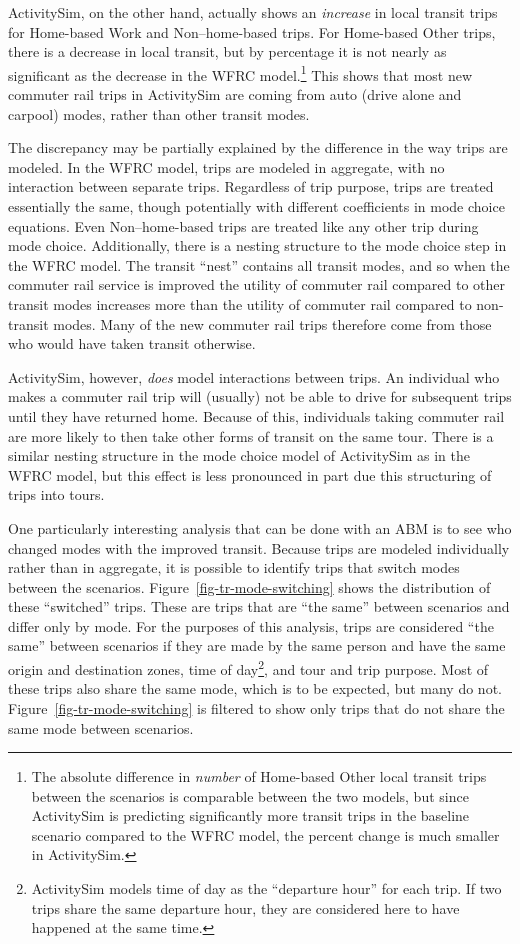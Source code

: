 \documentclass[fancy, twoside, mastersfancy, ms]{byuthesis}
\begin{document}
ActivitySim, on the other hand, actually shows an \emph{increase} in
local transit trips for Home-based Work and Non--home-based trips. For
Home-based Other trips, there is a decrease in local transit, but by
percentage it is not nearly as significant as the decrease in the WFRC
model.\footnote{The absolute difference in \emph{number} of Home-based
  Other local transit trips between the scenarios is comparable between
  the two models, but since ActivitySim is predicting significantly more
  transit trips in the baseline scenario compared to the WFRC model, the
  percent change is much smaller in ActivitySim.} This shows that most
new commuter rail trips in ActivitySim are coming from auto (drive alone
and carpool) modes, rather than other transit modes.

The discrepancy may be partially explained by the difference in the way
trips are modeled. In the WFRC model, trips are modeled in aggregate,
with no interaction between separate trips. Regardless of trip purpose,
trips are treated essentially the same, though potentially with
different coefficients in mode choice equations. Even Non--home-based
trips are treated like any other trip during mode choice. Additionally,
there is a nesting structure to the mode choice step in the WFRC model.
The transit ``nest'' contains all transit modes, and so when the
commuter rail service is improved the utility of commuter rail compared
to other transit modes increases more than the utility of commuter rail
compared to non-transit modes. Many of the new commuter rail trips
therefore come from those who would have taken transit otherwise.

ActivitySim, however, \emph{does} model interactions between trips. An
individual who makes a commuter rail trip will (usually) not be able to
drive for subsequent trips until they have returned home. Because of
this, individuals taking commuter rail are more likely to then take
other forms of transit on the same tour. There is a similar nesting
structure in the mode choice model of ActivitySim as in the WFRC model,
but this effect is less pronounced in part due this structuring of trips
into tours.

One particularly interesting analysis that can be done with an ABM is to
see who changed modes with the improved transit. Because trips are
modeled individually rather than in aggregate, it is possible to
identify trips that switch modes between the scenarios.
Figure~\ref{fig-tr-mode-switching} shows the distribution of these
``switched'' trips. These are trips that are ``the same'' between
scenarios and differ only by mode. For the purposes of this analysis,
trips are considered ``the same'' between scenarios if they are made by
the same person and have the same origin and destination zones, time of
day\footnote{ActivitySim models time of day as the ``departure hour''
  for each trip. If two trips share the same departure hour, they are
  considered here to have happened at the same time.}, and tour and trip
purpose. Most of these trips also share the same mode, which is to be
expected, but many do not. Figure~\ref{fig-tr-mode-switching} is
filtered to show only trips that do not share the same mode between
scenarios.
\end{document}
